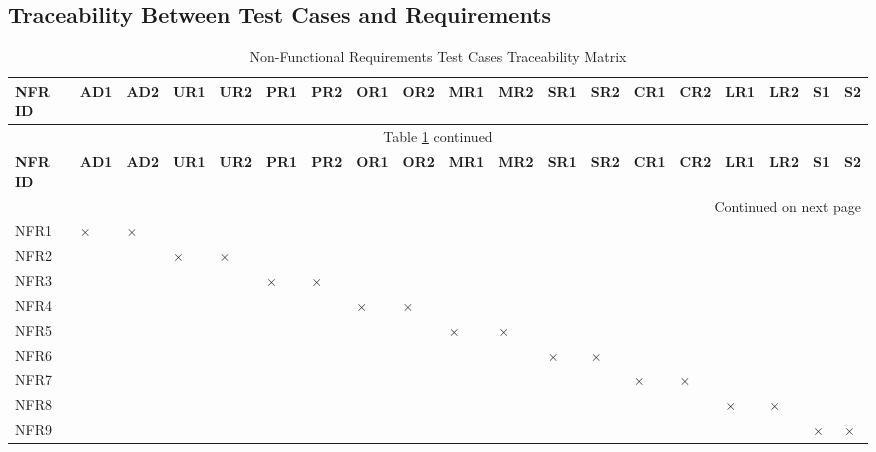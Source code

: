 \documentclass[12pt, titlepage]{article}
\begin{document}
\begin{landscape}
\subsection{Traceability Between Test Cases and Requirements}
\begingroup
\setlength{\tabcolsep}{4pt}  %
\begin{longtable}{|p{1.1cm}|p{0.85cm}|p{0.85cm}|p{0.85cm}|p{0.85cm}|p{0.85cm}|p{0.85cm}|p{0.85cm}|p{0.85cm}|p{0.85cm}|p{0.85cm}|p{0.85cm}|p{0.85cm}|p{0.85cm}|p{0.85cm}|p{0.85cm}|p{0.85cm}|p{0.6cm}|p{0.6cm}|}
\hline
\textbf{NFR ID} & \textbf{AD1} & \textbf{AD2} & \textbf{UR1} & \textbf{UR2} & \textbf{PR1} & \textbf{PR2} & \textbf{OR1} & \textbf{OR2} & \textbf{MR1} & \textbf{MR2} & \textbf{SR1} & \textbf{SR2} & \textbf{CR1} & \textbf{CR2} & \textbf{LR1} & \textbf{LR2} & \textbf{S1} & \textbf{S2} \\
\hline
\endfirsthead
\multicolumn{19}{c}{Table \ref{tab:nfr-test-traceability} continued} \\
\hline
\textbf{NFR ID} & \textbf{AD1} & \textbf{AD2} & \textbf{UR1} & \textbf{UR2} & \textbf{PR1} & \textbf{PR2} & \textbf{OR1} & \textbf{OR2} & \textbf{MR1} & \textbf{MR2} & \textbf{SR1} & \textbf{SR2} & \textbf{CR1} & \textbf{CR2} & \textbf{LR1} & \textbf{LR2} & \textbf{S1} & \textbf{S2} \\
\hline
\endhead
\hline
\multicolumn{19}{r}{Continued on next page} \\
\endfoot
\hline
\caption{Non-Functional Requirements Test Cases Traceability Matrix} \label{tab:nfr-test-traceability}
\endlastfoot
NFR1 & $\times$ & $\times$ & & & & & & & & & & & & & & & & \\
\hline
NFR2 & & & $\times$ & $\times$ & & & & & & & & & & & & & & \\
\hline
NFR3 & & & & & $\times$ & $\times$ & & & & & & & & & & & & \\
\hline
NFR4 & & & & & & & $\times$ & $\times$ & & & & & & & & & & \\
\hline
NFR5 & & & & & & & & & $\times$ & $\times$ & & & & & & & & \\
\hline
NFR6 & & & & & & & & & & & $\times$ & $\times$ & & & & & & \\
\hline
NFR7 & & & & & & & & & & & & & $\times$ & $\times$ & & & & \\
\hline
NFR8 & & & & & & & & & & & & & & & $\times$ & $\times$ & & \\
\hline
NFR9 & & & & & & & & & & & & & & & & & $\times$ & $\times$ \\
\end{longtable}
\endgroup
\end{landscape}
\newpage
\end{document}
